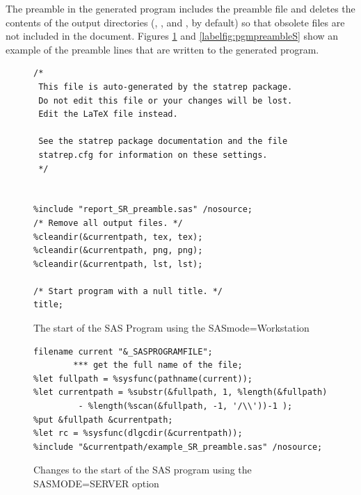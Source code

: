 \documentclass[article,oneside]{memoir}
\begin{document}
The preamble in the generated program includes the preamble file and deletes the contents of the
output directories (, , and , by default) so that obsolete files are
not included in the document.
Figures \ref{fig:pgmpreambleW} and \ref{labelfig:pgmpreambleS} show an example of the preamble lines
that are written to the generated program.
\begin{figure}[H]
\begin{snugshade}
\begin{verbatim}
/*
 This file is auto-generated by the statrep package.
 Do not edit this file or your changes will be lost.
 Edit the LaTeX file instead.

 See the statrep package documentation and the file
 statrep.cfg for information on these settings.
 */


%include "report_SR_preamble.sas" /nosource;
/* Remove all output files. */
%cleandir(&currentpath, tex, tex);
%cleandir(&currentpath, png, png);
%cleandir(&currentpath, lst, lst);

/* Start program with a null title. */
title;
\end{verbatim}
\end{snugshade}
\caption{The start of the SAS Program using the SASmode=Workstation}\label{fig:pgmpreambleW}
\end{figure}

\begin{figure}[H]
	\begin{snugshade}
		\begin{verbatim}
filename current "&_SASPROGRAMFILE"; 
		*** get the full name of the file;
%let fullpath = %sysfunc(pathname(current));
%let currentpath = %substr(&fullpath, 1, %length(&fullpath)
		 - %length(%scan(&fullpath, -1, '/\\'))-1 );
%put &fullpath &currentpath;
%let rc = %sysfunc(dlgcdir(&currentpath));
%include "&currentpath/example_SR_preamble.sas" /nosource;
		\end{verbatim}
	\end{snugshade}
	\caption{Changes to the start of the SAS program using the SASMODE=SERVER option}\label{fig:pgmpreambleS}
\end{figure}
\end{document}
